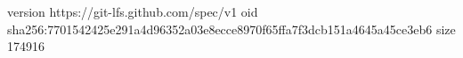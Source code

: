 version https://git-lfs.github.com/spec/v1
oid sha256:7701542425e291a4d96352a03e8ecce8970f65ffa7f3dcb151a4645a45ce3eb6
size 174916
